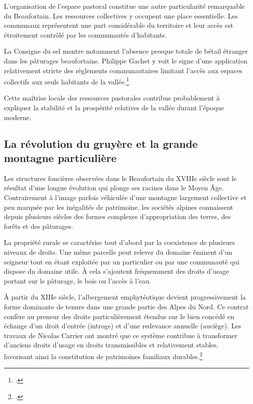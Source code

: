 \documentclass[12pt,a4paper]{report}
\begin{document}
L'organisation de l'espace pastoral constitue une autre particularité remarquable du Beaufortain. Les ressources collectives y occupent une place essentielle. Les communaux représentent une part considérable du territoire et leur accès est étroitement contrôlé par les communautés d'habitants.

La Consigne du sel montre notamment l'absence presque totale de bétail étranger dans les pâturages beaufortains. Philippe Gachet y voit le signe d'une application relativement stricte des règlements communautaires limitant l'accès aux espaces collectifs aux seuls habitants de la vallée.\footcite[88]{Gachet2011GabelleSel1561}

Cette maîtrise locale des ressources pastorales contribue probablement à expliquer la stabilité et la prospérité relatives de la vallée durant l'époque moderne.

\subsection{La révolution du gruyère et la grande montagne particulière}


Les structures foncières observées dans le Beaufortain du XVIIIe siècle sont le résultat d'une longue évolution qui plonge ses racines dans le Moyen Âge. Contrairement à l'image parfois véhiculée d'une montagne largement collective et peu marquée par les inégalités de patrimoine, les sociétés alpines connaissent depuis plusieurs siècles des formes complexes d'appropriation des terres, des forêts et des pâturages.

La propriété rurale se caractérise tout d'abord par la coexistence de plusieurs niveaux de droits. Une même parcelle peut relever du domaine éminent d'un seigneur tout en étant exploitée par un particulier ou par une communauté qui dispose du domaine utile. À cela s'ajoutent fréquemment des droits d'usage portant sur le pâturage, le bois ou l'accès à l'eau.

À partir du XIIIe siècle, l'\gls{albergement} emphytéotique devient progressivement la forme dominante de tenure dans une grande partie des Alpes du Nord. Ce contrat confère au preneur des droits particulièrement étendus sur le bien concédé en échange d'un droit d'entrée (\gls{introge}) et d'une redevance annuelle (\gls{auciège}). Les travaux de Nicolas Carrier ont montré que ce système contribue à transformer d'anciens droits d'usage en droits transmissibles et relativement stables, favorisant ainsi la constitution de patrimoines familiaux durables.\footcite[308--312]{Carrier2001VieMontagnardeFaucigny}
\end{document}
